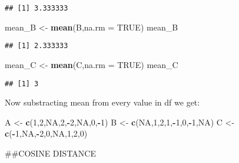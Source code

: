 \documentclass[
]{article}
\newenvironment{Shaded}{\begin{snugshade}}{\end{snugshade}}
\newcommand{\DataTypeTok}[1]{\textcolor[rgb]{0.13,0.29,0.53}{#1}}
\newcommand{\DecValTok}[1]{\textcolor[rgb]{0.00,0.00,0.81}{#1}}
\newcommand{\KeywordTok}[1]{\textcolor[rgb]{0.13,0.29,0.53}{\textbf{#1}}}
\newcommand{\NormalTok}[1]{#1}
\newcommand{\OperatorTok}[1]{\textcolor[rgb]{0.81,0.36,0.00}{\textbf{#1}}}
\newcommand{\OtherTok}[1]{\textcolor[rgb]{0.56,0.35,0.01}{#1}}
\newcommand{\StringTok}[1]{\textcolor[rgb]{0.31,0.60,0.02}{#1}}
\begin{document}
\begin{verbatim}
## [1] 3.333333
\end{verbatim}

\begin{Shaded}
\begin{Highlighting}[]
\NormalTok{mean_B <-}\StringTok{ }\KeywordTok{mean}\NormalTok{(B,}\DataTypeTok{na.rm =} \OtherTok{TRUE}\NormalTok{)}
\NormalTok{mean_B}
\end{Highlighting}
\end{Shaded}

\begin{verbatim}
## [1] 2.333333
\end{verbatim}

\begin{Shaded}
\begin{Highlighting}[]
\NormalTok{mean_C <-}\StringTok{ }\KeywordTok{mean}\NormalTok{(C,}\DataTypeTok{na.rm =} \OtherTok{TRUE}\NormalTok{)}
\NormalTok{mean_C}
\end{Highlighting}
\end{Shaded}

\begin{verbatim}
## [1] 3
\end{verbatim}

Now substracting mean from every value in df we get:

\begin{Shaded}
\begin{Highlighting}[]
\NormalTok{A <-}\StringTok{ }\KeywordTok{c}\NormalTok{(}\DecValTok{1}\NormalTok{,}\DecValTok{2}\NormalTok{,}\OtherTok{NA}\NormalTok{,}\DecValTok{2}\NormalTok{,}\OperatorTok{-}\DecValTok{2}\NormalTok{,}\OtherTok{NA}\NormalTok{,}\DecValTok{0}\NormalTok{,}\OperatorTok{-}\DecValTok{1}\NormalTok{)}
\NormalTok{B <-}\StringTok{ }\KeywordTok{c}\NormalTok{(}\OtherTok{NA}\NormalTok{,}\DecValTok{1}\NormalTok{,}\DecValTok{2}\NormalTok{,}\DecValTok{1}\NormalTok{,}\OperatorTok{-}\DecValTok{1}\NormalTok{,}\DecValTok{0}\NormalTok{,}\OperatorTok{-}\DecValTok{1}\NormalTok{,}\OtherTok{NA}\NormalTok{)}
\NormalTok{C <-}\StringTok{ }\KeywordTok{c}\NormalTok{(}\OperatorTok{-}\DecValTok{1}\NormalTok{,}\OtherTok{NA}\NormalTok{,}\OperatorTok{-}\DecValTok{2}\NormalTok{,}\DecValTok{0}\NormalTok{,}\OtherTok{NA}\NormalTok{,}\DecValTok{1}\NormalTok{,}\DecValTok{2}\NormalTok{,}\DecValTok{0}\NormalTok{)}
\end{Highlighting}
\end{Shaded}

\#\#COSINE DISTANCE
\end{document}
